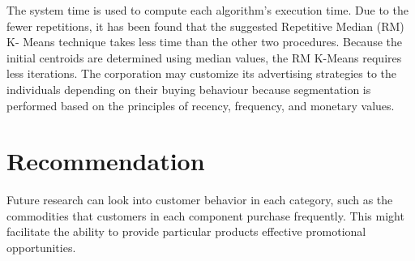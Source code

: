 \documentclass[a4paper]{article}
\begin{document}
The system time is used to compute each algorithm's execution time. Due to the fewer repetitions, it has been found that the suggested Repetitive Median (RM) K- Means technique takes less time than the other two procedures. Because the initial centroids are determined using median values, the RM K-Means requires less iterations. The corporation may customize its advertising strategies to the individuals depending on their buying behaviour because segmentation is performed based on the principles of recency, frequency, and monetary values. 

\section{Recommendation}

Future research can look into customer behavior in each category, such as the commodities that customers in each component purchase frequently. This might facilitate the ability to provide particular products effective promotional opportunities. 
\end{document}
